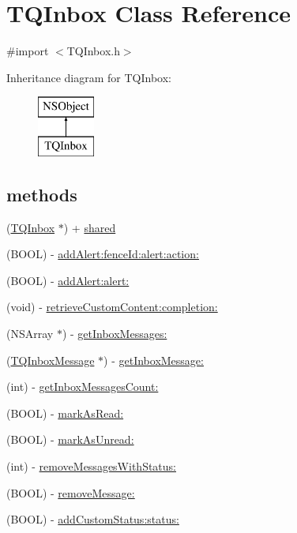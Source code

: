 \hypertarget{interface_t_q_inbox}{}\section{T\+Q\+Inbox Class Reference}
\label{interface_t_q_inbox}


{\ttfamily \#import $<$T\+Q\+Inbox.\+h$>$}

Inheritance diagram for T\+Q\+Inbox\+:\begin{figure}[H]
\begin{center}
\leavevmode
\includegraphics[height=2.000000cm]{interface_t_q_inbox}
\end{center}
\end{figure}
\subsection*{methods}
\begin{DoxyCompactItemize}
\item 
(\hyperlink{interface_t_q_inbox}{T\+Q\+Inbox} $\ast$) + \hyperlink{interface_t_q_inbox_addff5a4ce89ad34f6015c4f349ceb407}{shared}
\item 
(B\+O\+O\+L) -\/ \hyperlink{interface_t_q_inbox_a1e4abc18f0c11d2d47557448dae03113}{add\+Alert\+:fence\+Id\+:alert\+:action\+:}
\item 
(B\+O\+O\+L) -\/ \hyperlink{interface_t_q_inbox_a328211918a736eaf22cd1756f50adcb0}{add\+Alert\+:alert\+:}
\item 
(void) -\/ \hyperlink{interface_t_q_inbox_a0b13e889003893f499a099fe2605456f}{retrieve\+Custom\+Content\+:completion\+:}
\item 
(N\+S\+Array $\ast$) -\/ \hyperlink{interface_t_q_inbox_af74c125d553742be90efc16b3c0bf118}{get\+Inbox\+Messages\+:}
\item 
(\hyperlink{interface_t_q_inbox_message}{T\+Q\+Inbox\+Message} $\ast$) -\/ \hyperlink{interface_t_q_inbox_a06be946ff7d05d6a54eb0379e916d3fb}{get\+Inbox\+Message\+:}
\item 
(int) -\/ \hyperlink{interface_t_q_inbox_a949a8144d968545d7988cde6192ba33c}{get\+Inbox\+Messages\+Count\+:}
\item 
(B\+O\+O\+L) -\/ \hyperlink{interface_t_q_inbox_a64013736989134e4b7f778d2b2cc669d}{mark\+As\+Read\+:}
\item 
(B\+O\+O\+L) -\/ \hyperlink{interface_t_q_inbox_a7e716661eb1f0380af913bc5c65555d5}{mark\+As\+Unread\+:}
\item 
(int) -\/ \hyperlink{interface_t_q_inbox_a30780710283c7e6deceee5b786187e79}{remove\+Messages\+With\+Status\+:}
\item 
(B\+O\+O\+L) -\/ \hyperlink{interface_t_q_inbox_a3842fcc859c78bb50fd18ca0a39b290b}{remove\+Message\+:}
\item 
(B\+O\+O\+L) -\/ \hyperlink{interface_t_q_inbox_a01b262a134221af86ff3118b752486da}{add\+Custom\+Status\+:status\+:}
\end{DoxyCompactItemize}


